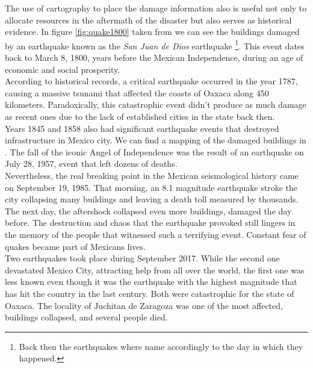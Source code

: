 The use of cartography to place the damage information also is useful not only to allocate resources in the aftermath of the disaster but also serves as historical evidence. In figure \ref{fig:quake1800} taken from \cite{AG3316} we can see the buildings damaged by an earthquake known as the \textit{San Juan de Dios} earthquake \footnote{Back then the earthquakes where name accordingly to the day in which they happened.}. This event dates back to March 8, 1800, years before the Mexican Independence, during an age of economic and social prosperity.\\

According to historical records, a critical earthquake occurred in the year 1787, causing a massive tsunami that affected the coasts of Oaxaca along 450 kilometers. Paradoxically, this catastrophic event didn't produce as much damage as recent ones due to the lack of established cities in the state back then.\\

Years 1845 and 1858 also had significant earthquake events that destroyed infrastructure in Mexico city. We can find a mapping of the damaged buildings in \cite{AG3316}. The fall of the iconic Angel of Independence was the result of an earthquake on July 28, 1957, event that left dozens of deaths.\\

Nevertheless, the real breaking point in the Mexican seismological history came on September 19, 1985. That morning, an 8.1 magnitude earthquake stroke the city collapsing many buildings and leaving a death toll measured by thousands. The next day, the aftershock collapsed even more buildings, damaged the day before. The destruction and chaos that the earthquake provoked still lingers in the memory of the people that witnessed such a terrifying event. Constant fear of quakes became part of Mexicans lives.\\

Two earthquakes took place during September 2017. While the second one devastated Mexico City, attracting help from all over the world, the first one was less known even though it was the earthquake with the highest magnitude that has hit the country in the last century. Both were catastrophic for the state of Oaxaca. The locality of Juchitan de Zaragoza was one of the most affected, buildings collapsed, and several people died.\\


